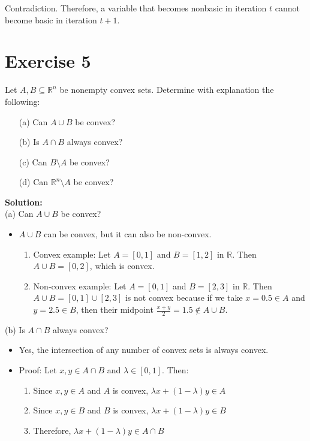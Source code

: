 \documentclass{article}
\begin{document}
Contradiction. Therefore, a variable that becomes nonbasic in iteration $t$ cannot become basic in iteration $t+1$.

\newpage

\section*{Exercise 5}
Let $A, B \subseteq \mathbb{R}^n$ be nonempty convex sets. Determine with explanation the following:
\begin{enumerate}
\item[(a)] Can $A \cup B$ be convex?
\item[(b)] Is $A \cap B$ always convex?
\item[(c)] Can $B \setminus A$ be convex?
\item[(d)] Can $\mathbb{R}^n \setminus A$ be convex?
\end{enumerate}

\textbf{Solution:} \\

(a) Can $A \cup B$ be convex?
\begin{itemize}
\item $A \cup B$ can be convex, but it can also be non-convex.
    \begin{enumerate}
    \item Convex example: Let $A = [0,1]$ and $B = [1,2]$ in $\mathbb{R}$. Then $A \cup B = [0,2]$, which is convex.
    \item Non-convex example: Let $A = [0,1]$ and $B = [2,3]$ in $\mathbb{R}$. Then $A \cup B = [0,1] \cup [2,3]$ is not convex because if we take $x = 0.5 \in A$ and $y = 2.5 \in B$, then their midpoint $\frac{x+y}{2} = 1.5 \notin A \cup B$.
    \end{enumerate}
\end{itemize}

(b) Is $A \cap B$ always convex?
\begin{itemize}
\item Yes, the intersection of any number of convex sets is always convex.
\item Proof: Let $x, y \in A \cap B$ and $\lambda \in [0,1]$. Then:
    \begin{enumerate}
    \item Since $x,y \in A$ and $A$ is convex, $\lambda x + (1-\lambda)y \in A$
    \item Since $x,y \in B$ and $B$ is convex, $\lambda x + (1-\lambda)y \in B$
    \item Therefore, $\lambda x + (1-\lambda)y \in A \cap B$
    \end{enumerate}
\end{itemize}
\end{document}

